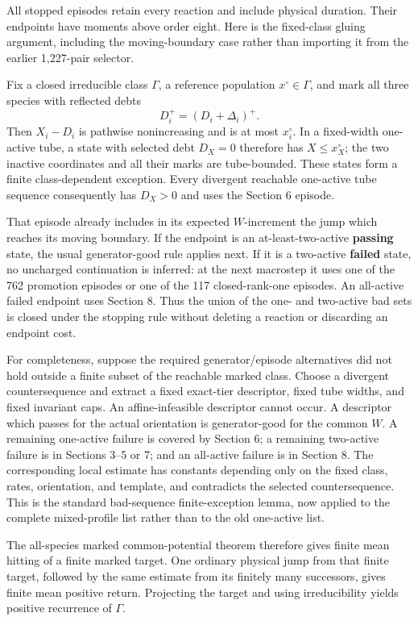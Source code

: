 All stopped episodes retain every reaction and include physical
duration. Their endpoints have moments above order eight. Here is the
fixed-class gluing argument, including the moving-boundary case rather
than importing it from the earlier 1,227-pair selector.

Fix a closed irreducible class \(\Gamma\), a reference population
\(x^\circ\in\Gamma\), and mark all three species with reflected debts \[
 D_i^+=(D_i+\Delta_i)^+ .                            \tag{9.1}
\] Then \(X_i-D_i\) is pathwise nonincreasing and is at most
\(x_i^\circ\). In a fixed-width one-active tube, a state with selected
debt \(D_X=0\) therefore has \(X\le x_X^\circ\); the two inactive
coordinates and all their marks are tube-bounded. These states form a
finite class-dependent exception. Every divergent reachable one-active
tube sequence consequently has \(D_X>0\) and uses the Section 6 episode.

That episode already includes in its expected \(W\)-increment the jump
which reaches its moving boundary. If the endpoint is an
at-least-two-active \textbf{passing} state, the usual generator-good
rule applies next. If it is a two-active \textbf{failed} state, no
uncharged continuation is inferred: at the next macrostep it uses one of
the 762 promotion episodes or one of the 117 closed-rank-one episodes.
An all-active failed endpoint uses Section 8. Thus the union of the one-
and two-active bad sets is closed under the stopping rule without
deleting a reaction or discarding an endpoint cost.

For completeness, suppose the required generator/episode alternatives
did not hold outside a finite subset of the reachable marked class.
Choose a divergent countersequence and extract a fixed exact-tier
descriptor, fixed tube widths, and fixed invariant caps. An
affine-infeasible descriptor cannot occur. A descriptor which passes for
the actual orientation is generator-good for the common \(W\). A
remaining one-active failure is covered by Section 6; a remaining
two-active failure is in Sections 3--5 or 7; and an all-active failure
is in Section 8. The corresponding local estimate has constants
depending only on the fixed class, rates, orientation, and template, and
contradicts the selected countersequence. This is the standard
bad-sequence finite-exception lemma, now applied to the complete
mixed-profile list rather than to the old one-active list.

The all-species marked common-potential theorem therefore gives finite
mean hitting of a finite marked target. One ordinary physical jump from
that finite target, followed by the same estimate from its finitely many
successors, gives finite mean positive return. Projecting the target and
using irreducibility yields positive recurrence of \(\Gamma\).

